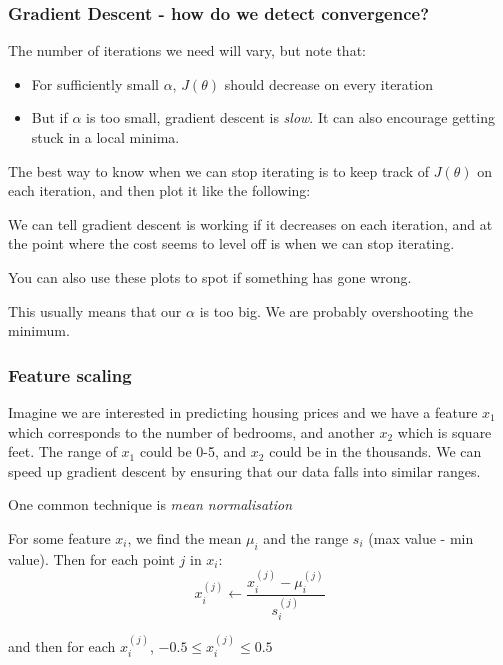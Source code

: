 \documentclass[12pt]{article}
\begin{document}
\subsubsection{Gradient Descent - how do we detect convergence?}

The number of iterations we need will vary, but note that:
\begin{itemize}
\item For sufficiently small $\alpha$, $J(\theta)$ should decrease on every iteration
\item But if $\alpha$ is too small, gradient descent is \textit{slow}. It can also encourage getting stuck in a local minima.
\end{itemize}

The best way to know when we can stop iterating is to keep track of $J(\theta)$ on each iteration, and then plot it like the following:


We can tell gradient descent is working if it decreases on each iteration, and at the point where the cost seems to level off is when we can stop iterating.

You can also use these plots to spot if something has gone wrong.


This usually means that our $\alpha$ is too big. We are probably overshooting the minimum.

\subsubsection{Feature scaling}

Imagine we are interested in predicting housing prices and we have a feature $x_1$ which corresponds to the number of bedrooms, and another $x_2$ which is square feet. The range of $x_1$ could be 0-5, and $x_2$ could be in the thousands. We can speed up gradient descent by ensuring that our data falls into similar ranges.

One common technique is \textit{mean normalisation}

For some feature $x_i$, we find the mean $\mu_i$ and the range $s_i$ (max value - min value). Then for each point $j$ in $x_i$:
\[
x_i^{(j)} \leftarrow \frac{x_i^{(j)} - \mu_i^{(j)}}{s_i^{(j)}}
\]

and then for each $x_i^{(j)} $, $-0.5 \leq x_i^{(j)}  \leq 0.5$
\end{document}
